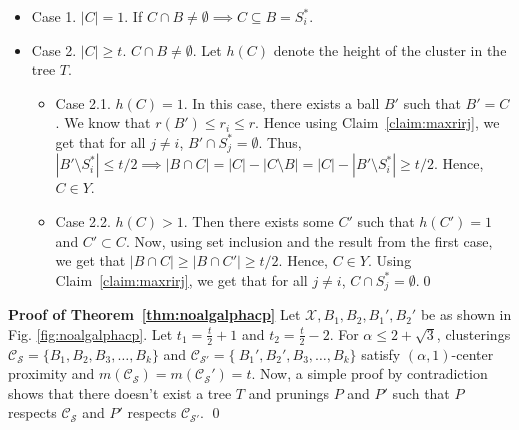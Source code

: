 \documentclass[letterpaper,12pt,titlepage,oneside,final]{book}
\newcommand{\mc}{\mathcal}
\begin{document}
\begin{itemize}[nolistsep,leftmargin=*]
\item Case 1. $|C| = 1$. If $C \cap B \neq \emptyset \implies C \subseteq B = S_i^*$.
\item Case 2. $|C|\ge t$. $C \cap B \neq \emptyset$. Let $h(C)$ denote the height of the cluster in the tree $T$. 
\begin{itemize}[leftmargin=*]
\renewcommand\labelitemii{$\circ$}
\item Case 2.1. $h(C) = 1$. In this case, there exists a ball $B'$ such that $B' = C$. We know that $r(B') \le r_i \le r$. Hence using Claim~\ref{claim:maxrirj}, we get that for all $j \neq i$, $B' \cap S_j^* = \emptyset$. Thus, $|B'\setminus S_i^*| \le t/2 \implies |B\cap C| = |C| - |C\setminus B| = |C| - |B'\setminus S_i^*| \ge t/2$. Hence, $C \in Y$.

\item Case 2.2. $h(C) > 1$. Then there exists some $C'$ such that $h(C') = 1$ and $C' \subset C$. Now, using set inclusion and the result from the first case, we get that $|B\cap C| \ge |B\cap C'| \ge t/2$. Hence, $C \in Y$. Using Claim~\ref{claim:maxrirj}, we get that for all $j \neq i$, $C \cap S_j^* = \emptyset$.\qed\\
\end{itemize} 
\end{itemize}


\noindent\textbf{Proof of Theorem~\ref{thm:noalgalphacp}}
Let $\mc X, B_1, B_2, B_1', B_2'$ be as shown in Fig. \ref{fig:noalgalphacp}. Let $t_1 = \frac{t}{2}+1$ and $t_2 = \frac{t}{2}-2$. For $\alpha \le 2+\sqrt{3}$, clusterings $\mc C_{\mc S} = \{B_1, B_2, B_3, \ldots, B_k\}$ and $\mc C_{\mc S'} = \{\ B_1', B_2', B_3, \ldots, B_k\}$ satisfy $(\alpha, 1)$-center proximity and $m(\mc C_{\mc S}) = m(\mc C_{\mc S}') = t$. Now, a simple proof by contradiction shows that there doesn't exist a tree $T$ and prunings $P$ and $P'$ such that $P$ respects $\mc C_{\mc S}$ and $P'$ respects $\mc C_{\mc S'}$. \qed\\
\end{document}
